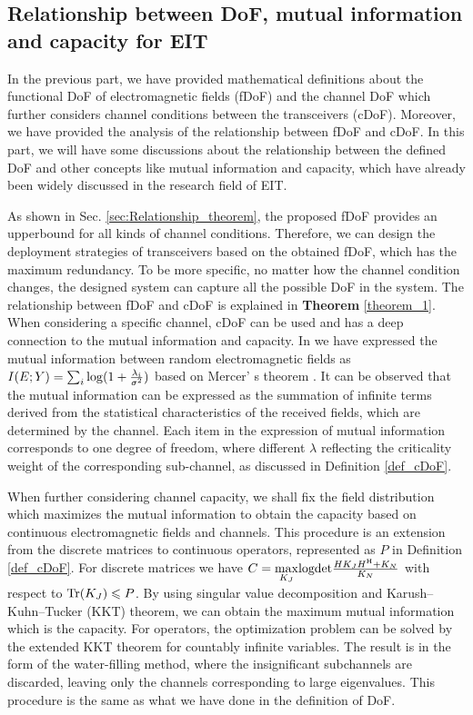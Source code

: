 \documentclass[12pt,draftclsnofoot,journal,onecolumn]{IEEEtran}
\begin{document}
	{\color{red}\subsection{Relationship between DoF, mutual information and capacity for EIT}
	
	In the previous part, we have provided mathematical definitions about the functional DoF of electromagnetic fields (fDoF) and the channel DoF which further considers channel conditions between the transceivers (cDoF). Moreover, we have provided the analysis of the relationship between fDoF and cDoF. In this part, we will have some discussions about the relationship between the defined DoF and other concepts like mutual information and capacity, which have already been widely discussed in the research field of EIT.

	As shown in Sec. \ref{sec:Relationship_theorem}, the proposed fDoF provides an upperbound for all kinds of channel conditions. Therefore, we can design the deployment strategies of transceivers based on the obtained fDoF, which has the maximum redundancy. To be more specific, no matter how the channel condition changes, the designed system can capture all the possible DoF in the system. The relationship between fDoF and cDoF is explained in {\bf Theorem} \ref{theorem_1}. When considering a specific channel, cDoF can be used and has a deep connection to the mutual information and capacity. In \cite{wan2022mutual} we have expressed the mutual information between random electromagnetic fields as $I(E;Y) = \sum_i{\rm log}(1+\frac{\lambda_i}{\sigma^2})$ based on Mercer' s theorem \cite{mercer1909xvi}. It can be observed that the mutual information can be expressed as the summation of infinite terms derived from the statistical characteristics of the received fields, which are determined by the channel. Each item in the expression of mutual information corresponds to one degree of freedom, where different $\lambda$ reflecting the criticality weight of the corresponding sub-channel, as discussed in Definition \ref{def_cDoF}.

	When further considering channel capacity, we shall fix the field distribution which maximizes the mutual information to obtain the capacity based on continuous electromagnetic fields and channels. This procedure is an extension from the discrete matrices to continuous operators, represented as $P$ in Definition \ref{def_cDoF}. For discrete matrices we have $C = \underset{K_J}{\rm max}{\rm logdet}\frac{HK_JH^{\rm H}+K_N}{K_N}$ with respect to ${\rm Tr}(K_J) \leqslant P$. By using singular value decomposition and Karush–Kuhn–Tucker (KKT) theorem, we can obtain the maximum mutual information which is the capacity. For operators, the optimization problem can be solved by the extended KKT theorem \cite{bachir2021finitely} for countably infinite variables. The result is in the form of the water-filling method, where the insignificant subchannels are discarded, leaving only the channels corresponding to large eigenvalues. This procedure is the same as what we have done in the definition of DoF. 

}
\end{document}
